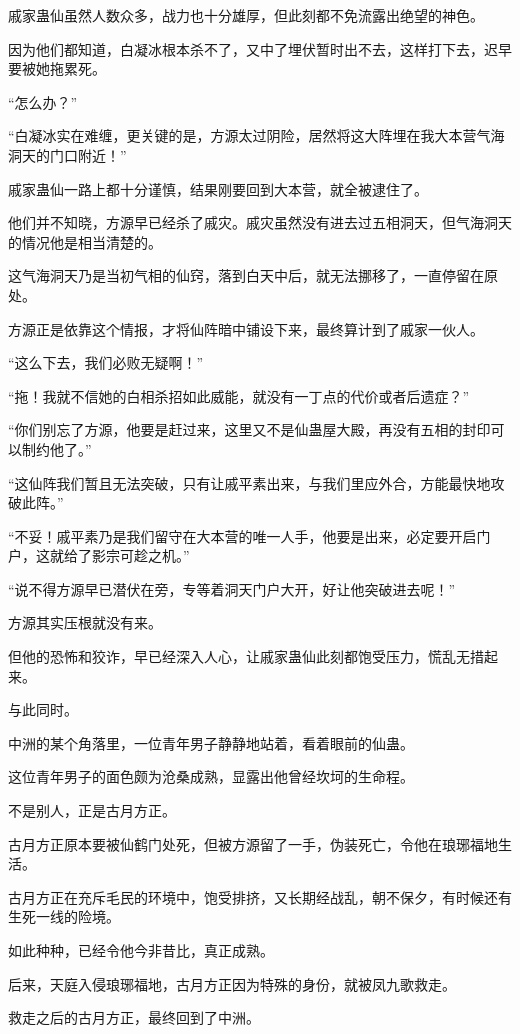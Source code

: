 \begin{this_body}
戚家蛊仙虽然人数众多，战力也十分雄厚，但此刻都不免流露出绝望的神色。

因为他们都知道，白凝冰根本杀不了，又中了埋伏暂时出不去，这样打下去，迟早要被她拖累死。

“怎么办？”

“白凝冰实在难缠，更关键的是，方源太过阴险，居然将这大阵埋在我大本营气海洞天的门口附近！”

戚家蛊仙一路上都十分谨慎，结果刚要回到大本营，就全被逮住了。

他们并不知晓，方源早已经杀了戚灾。戚灾虽然没有进去过五相洞天，但气海洞天的情况他是相当清楚的。

这气海洞天乃是当初气相的仙窍，落到白天中后，就无法挪移了，一直停留在原处。

方源正是依靠这个情报，才将仙阵暗中铺设下来，最终算计到了戚家一伙人。

“这么下去，我们必败无疑啊！”

“拖！我就不信她的白相杀招如此威能，就没有一丁点的代价或者后遗症？”

“你们别忘了方源，他要是赶过来，这里又不是仙蛊屋大殿，再没有五相的封印可以制约他了。”

“这仙阵我们暂且无法突破，只有让戚平素出来，与我们里应外合，方能最快地攻破此阵。”

“不妥！戚平素乃是我们留守在大本营的唯一人手，他要是出来，必定要开启门户，这就给了影宗可趁之机。”

“说不得方源早已潜伏在旁，专等着洞天门户大开，好让他突破进去呢！”

方源其实压根就没有来。

但他的恐怖和狡诈，早已经深入人心，让戚家蛊仙此刻都饱受压力，慌乱无措起来。

与此同时。

中洲的某个角落里，一位青年男子静静地站着，看着眼前的仙蛊。

这位青年男子的面色颇为沧桑成熟，显露出他曾经坎坷的生命程。

不是别人，正是古月方正。

古月方正原本要被仙鹤门处死，但被方源留了一手，伪装死亡，令他在琅琊福地生活。

古月方正在充斥毛民的环境中，饱受排挤，又长期经战乱，朝不保夕，有时候还有生死一线的险境。

如此种种，已经令他今非昔比，真正成熟。

后来，天庭入侵琅琊福地，古月方正因为特殊的身份，就被凤九歌救走。

救走之后的古月方正，最终回到了中洲。


\end{this_body}
